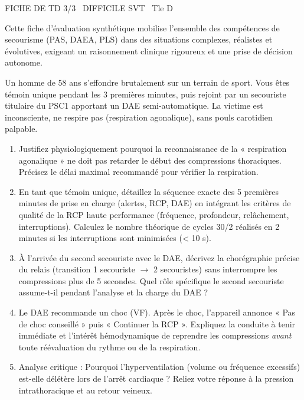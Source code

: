\documentclass[11pt]{article}
\begin{document}
\begin{tcolorbox}[enhanced,colback=popink,colframe=popink,arc=10pt,boxrule=0pt,left=12pt,right=12pt,top=9pt,bottom=9pt]
{\color{white}\popxbold\small FICHE DE TD 3/3 \textbullet\ DIFFICILE \hfill SVT \textbullet\ Tle D\par}
\end{tcolorbox}
\vspace{4pt}
\noindent Cette fiche d'évaluation synthétique mobilise l'ensemble des compétences de secourisme (PAS, DAEA, PLS) dans des situations complexes, réalistes et évolutives, exigeant un raisonnement clinique rigoureux et une prise de décision autonome.

\begin{exercice}
Un homme de 58 ans s'effondre brutalement sur un terrain de sport. Vous êtes témoin unique pendant les 3 premières minutes, puis rejoint par un secouriste titulaire du PSC1 apportant un DAE semi-automatique. La victime est inconsciente, ne respire pas (respiration agonalique), sans pouls carotidien palpable.
\begin{enumerate}
    \item Justifiez physiologiquement pourquoi la reconnaissance de la « respiration agonalique » ne doit pas retarder le début des compressions thoraciques. Précisez le délai maximal recommandé pour vérifier la respiration.
    \item En tant que témoin unique, détaillez la séquence exacte des 5 premières minutes de prise en charge (alertes, RCP, DAE) en intégrant les critères de qualité de la RCP haute performance (fréquence, profondeur, relâchement, interruptions). Calculez le nombre théorique de cycles 30/2 réalisés en 2 minutes si les interruptions sont minimisées (< 10 s).
    \item À l'arrivée du second secouriste avec le DAE, décrivez la chorégraphie précise du relais (transition 1 secouriste $\rightarrow$ 2 secouristes) sans interrompre les compressions plus de 5 secondes. Quel rôle spécifique le second secouriste assume-t-il pendant l'analyse et la charge du DAE ?
    \item Le DAE recommande un choc (VF). Après le choc, l'appareil annonce « Pas de choc conseillé » puis « Continuer la RCP ». Expliquez la conduite à tenir immédiate et l'intérêt hémodynamique de reprendre les compressions \textit{avant} toute réévaluation du rythme ou de la respiration.
    \item Analyse critique : Pourquoi l'hyperventilation (volume ou fréquence excessifs) est-elle délétère lors de l'arrêt cardiaque ? Reliez votre réponse à la pression intrathoracique et au retour veineux.
\end{enumerate}
\end{exercice}
\end{document}
